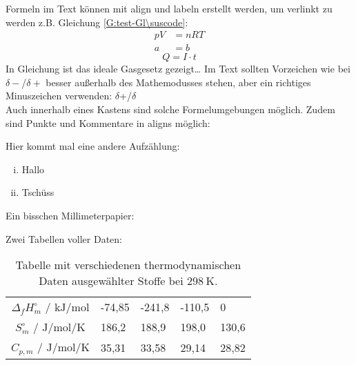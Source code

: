 \documentclass[./main.tex]{subfiles}
\begin{document}
Formeln im Text können mit align und labeln erstellt werden, um verlinkt zu werden z.B. Gleichung \ref{G:test-Gl\suscode}:
\begin{align}
    pV &= nRT \label{G:test-Gl\suscode}\\
    a &= b
\end{align}
\begin{equation*}
    Q = I \cdot t
\end{equation*}
In Gleichung ist das ideale Gasgesetz gezeigt\ldots 
Im Text sollten Vorzeichen wie bei $\delta-$/$\delta+$ besser au\ss{}erhalb des Mathemodusses stehen, aber ein richtiges Minuszeichen verwenden: $\delta$+/$\delta$\textminus{}\\
Auch innerhalb eines Kastens sind solche Formelumgebungen möglich. Zudem sind Punkte und Kommentare in aligns möglich:\par
{}
Hier kommt mal eine andere Aufz\"ahlung:
\begin{enumerate}[(i)]
    \item Hallo
    \item Tschüss
\end{enumerate}

Ein bisschen Millimeterpapier:\\


Zwei Tabellen voller Daten:
\begin{table}[H]
    \caption{Tabelle mit verschiedenen thermodynamischen Daten ausgew\"ahlter Stoffe bei $\SI{298}{\kelvin}$.}
    \label{tab: 2025-10-3_therm. Daten\suscode}
    \centering
    \begin{tabular}{|c|C{1.5cm}|C{1.5cm}|C{1.5cm}|C{1.5cm}|}
    \hline
        &  &  &  & \\\hline
        $\Delta_fH^{\circ}_m$ / $\si{\kilo\joule\per\mole}$ & -74,85 & -241,8 & -110,5 & 0\\\hline
        $S^{\circ}_m$ / $\si{\joule\per\mole\per\kelvin}$ & 186,2 & 188,9 & 198,0 & 130,6\\\hline
        $C_{p, m}$ / $\si{\joule\per\mole\per\kelvin}$ & 35,31 & 33,58 & 29,14 & 28,82\\\hline
    \end{tabular}
\end{table}
\end{document}
